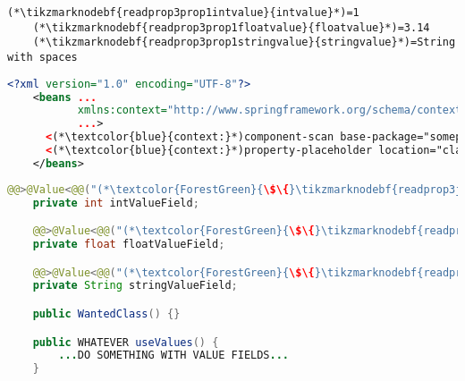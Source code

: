 \example
\begin{lstlisting}[title={A \path{.properties} file called \tikzmarknodebf{readprop3prop1filename}{\textit{annotations.properties}}}]
    (*\tikzmarknodebf{readprop3prop1intvalue}{intvalue}*)=1
    (*\tikzmarknodebf{readprop3prop1floatvalue}{floatvalue}*)=3.14
    (*\tikzmarknodebf{readprop3prop1stringvalue}{stringvalue}*)=String with spaces
\end{lstlisting}
\begin{lstlisting}[language=XML, title={Configuration XML}]
    <?xml version="1.0" encoding="UTF-8"?>
    <beans ...
           xmlns:context="http://www.springframework.org/schema/context"
           ...>
      <(*\textcolor{blue}{context:}*)component-scan base-package="somepackage.subpackage"/>
      <(*\textcolor{blue}{context:}*)property-placeholder location="classpath:(*\tikzmarknodebf{readprop3xml1filename}{annotations.properties}[ForestGreen]*)" file-encoding="utf-8"/>
    </beans>
\end{lstlisting}
\begin{lstlisting}[language=Java, title={Wanted class with the zero--parameter constructor}]
    @@>@Value<@@("(*\textcolor{ForestGreen}{\$\{}\tikzmarknodebf{readprop3java1intvalue}{intvalue}[ForestGreen]\textcolor{ForestGreen}{\}}*)")
    private int intValueField;

    @@>@Value<@@("(*\textcolor{ForestGreen}{\$\{}\tikzmarknodebf{readprop3java1floatvalue}{floatvalue}[ForestGreen]\textcolor{ForestGreen}{\}}*)")
    private float floatValueField;

    @@>@Value<@@("(*\textcolor{ForestGreen}{\$\{}\tikzmarknodebf{readprop3java1stringvalue}{stringvalue}[ForestGreen]\textcolor{ForestGreen}{\}}*)")
    private String stringValueField;

    public WantedClass() {}

    public WHATEVER useValues() {
        ...DO SOMETHING WITH VALUE FIELDS...
    }
\end{lstlisting}
\newpage